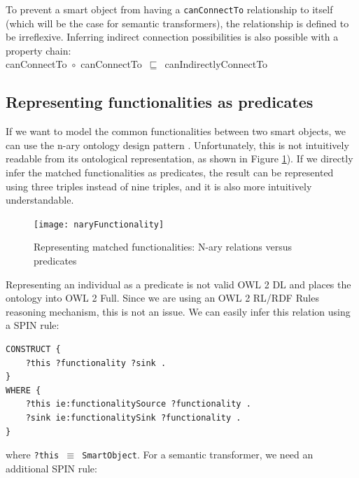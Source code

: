 To prevent a smart object from having a \texttt{canConnectTo} relationship to itself (which will be the case for semantic transformers), the relationship is defined to be irreflexive. Inferring indirect connection possibilities is also possible with a property chain:\\

\noindent
canConnectTo~\ensuremath{\circ}~canConnectTo~\ensuremath{\sqsubseteq}~canIndirectlyConnectTo



\subsection{Representing functionalities as predicates}

If we want to model the common functionalities between two smart objects, we can use the n-ary ontology design pattern \cite{Noy2006}. Unfortunately, this is not intuitively readable from its ontological representation, as shown in Figure \ref{naryFunctionality}). If we directly infer the matched functionalities as predicates, the result can be represented using three triples instead of nine triples, and it is also more intuitively understandable.

\begin{figure}[bth]
        \texttt{[image: naryFunctionality]}
        \caption{Representing matched functionalities: N-ary relations versus predicates}
        \label{naryFunctionality}
\end{figure}

Representing an individual as a predicate is not valid OWL 2 DL and places the ontology into OWL 2 Full. Since we are using an OWL 2 RL/RDF Rules reasoning mechanism, this is not an issue. We can easily infer this relation using a \ac{SPIN} rule:

\begin{verbatim}
CONSTRUCT {
    ?this ?functionality ?sink .
}
WHERE {
    ?this ie:functionalitySource ?functionality .
    ?sink ie:functionalitySink ?functionality .
}
\end{verbatim}

where \texttt{?this \ensuremath{\equiv} SmartObject}. For a semantic transformer, we need an additional \ac{SPIN} rule:

